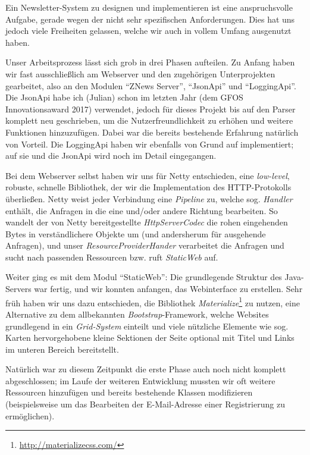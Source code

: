 Ein Newsletter-System zu designen und implementieren ist
eine anspruchsvolle Aufgabe,
gerade wegen der nicht sehr spezifischen Anforderungen.
Dies hat uns jedoch viele Freiheiten gelassen,
welche wir auch in vollem Umfang ausgenutzt haben.

Unser Arbeitsprozess lässt sich grob in drei Phasen aufteilen.
Zu Anfang haben wir fast ausschließlich am Webserver und den zugehörigen
Unterprojekten gearbeitet,
also an den Modulen ``ZNews Server'', ``JsonApi'' und ``LoggingApi''.
Die JsonApi habe ich (Julian) schon im letzten Jahr
(dem GFOS Innovationsaward 2017) verwendet,
jedoch für dieses Projekt bis auf den Parser komplett neu geschrieben,
um die Nutzerfreundlichkeit zu erhöhen und weitere Funktionen hinzuzufügen.
Dabei war die bereits bestehende Erfahrung natürlich von Vorteil.
Die LoggingApi haben wir ebenfalls von Grund auf implementiert;
auf sie und die JsonApi wird noch im Detail eingegangen.

Bei dem Webserver selbst haben wir uns für Netty entschieden,
eine \emph{low-level}, robuste, schnelle Bibliothek,
der wir die Implementation des HTTP-Protokolls überließen.
Netty weist jeder Verbindung eine \emph{Pipeline} zu,
welche sog. \emph{Handler} enthält,
die Anfragen in die eine und/oder andere Richtung bearbeiten.
So wandelt der von Netty bereitgestellte \emph{HttpServerCodec}
die rohen eingehenden Bytes in verständlichere Objekte um
(und andersherum für ausgehende Anfragen),
und unser \emph{ResourceProviderHander} verarbeitet die Anfragen
und sucht nach passenden Ressourcen bzw. ruft \emph{StaticWeb} auf.

Weiter ging es mit dem Modul ``StaticWeb'':
Die grundlegende Struktur des Java-Servers war fertig,
und wir konnten anfangen,
das Webinterface zu erstellen.
Sehr früh haben wir uns dazu entschieden,
die Bibliothek \emph{Materialize}\footnote{\url{http://materializecss.com/}}
zu nutzen,
eine Alternative zu dem allbekannten \emph{Bootstrap}-Framework,
welche Websites grundlegend in ein \emph{Grid-System} einteilt
und viele nützliche Elemente wie sog. Karten \textemdash{}
hervorgehobene kleine Sektionen der Seite optional mit Titel und Links im unteren Bereich \textemdash{}
bereitstellt.

Natürlich war zu diesem Zeitpunkt die erste Phase auch noch nicht komplett abgeschlossen;
im Laufe der weiteren Entwicklung mussten wir oft weitere Ressourcen hinzufügen
und bereits bestehende Klassen modifizieren
(beispielsweise um das Bearbeiten der E-Mail-Adresse einer Registrierung zu ermöglichen).

